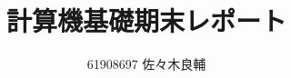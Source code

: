 \documentclass[uplatex,a4j,11pt]{jsarticle}
\begin{document}
\title{計算機基礎期末レポート}
\author{61908697 佐々木良輔}
\maketitle
\newpage





\end{document}
